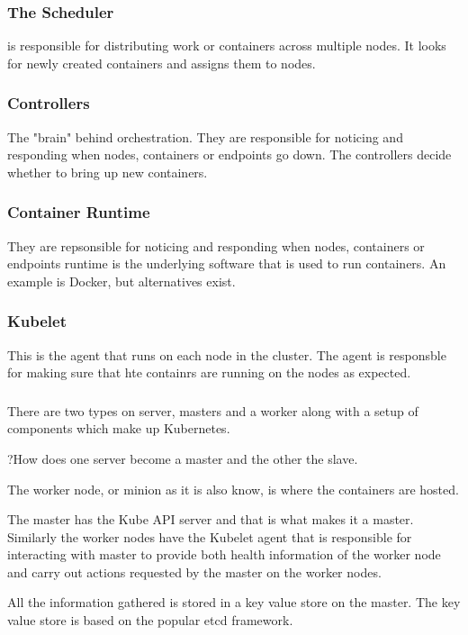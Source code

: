 \documentclass[11pt]{book}
\begin{document}
    \subsubsection{The Scheduler}
    is responsible for distributing work or containers across multiple nodes.
    It looks for newly created containers and assigns them to nodes.

    \subsubsection{Controllers}
    The "brain" behind orchestration.
    They are responsible for noticing and responding when nodes, containers or endpoints go down.
    The controllers decide whether to bring up new containers.

    \subsubsection{Container Runtime}
    They are repsonsible for noticing and responding when nodes, containers or endpoints runtime is the underlying software that is used to run containers.
    An example is Docker, but alternatives exist.

    \subsubsection{Kubelet}
    This is the agent that runs on each node in the cluster.
    The agent is responsble for making sure that hte containrs are running on the nodes as expected.

    \subsubsection{}
    There are two types on server, masters and a worker along with a setup of components which make up Kubernetes.

    ?How does one server become a master and the other the slave.

    The worker node, or minion as it is also know, is where the containers are hosted.

    The master has the Kube API server and that is what makes it a master.
    Similarly the worker nodes have the Kubelet agent that is responsible for interacting with master to provide both health information of the worker node and carry out actions requested by the master on the worker nodes.

    All the information gathered is stored in a key value store on the master.
    The key value store is based on the popular etcd framework.
\end{document}
